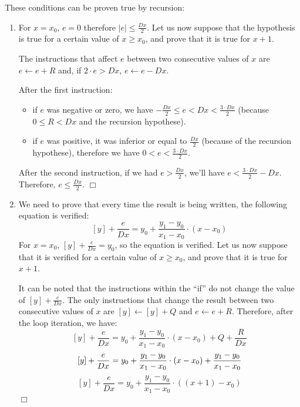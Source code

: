 \documentclass[a4paper,11pt]{kthesis}
\begin{document}
These conditions can be proven true by recursion:
\begin{enumerate}
\item For $x = x_{0}$, $e = 0$ therefore $|e| \leq \frac{Dx}{2}$. Let us now suppose that the hypothesis is true for a certain value of $x \geq x_{0}$, and prove that it is true for $x+1$.

The instructions that affect $e$ between two consecutive values of $x$ are $e \leftarrow e + R$ and, if $2\cdot e > Dx$, $e \leftarrow e - Dx$.

After the first instruction:
\begin{itemize}
\item if $e$ was negative or zero, we have $-\frac{Dx}{2} \leq e < Dx < \frac{3 \cdot Dx}{2} $ (because $0 \leq R < Dx$ and the recursion hypothese).
\item if $e$ was positive, it was inferior or equal to $\frac{Dx}{2}$ (because of the recursion hypothese), therefore we have $0 < e < \frac{3 \cdot Dx}{2} $.
\end{itemize}
After the second instruction, if we had $e > \frac{Dx}{2}$, we'll have $e < \frac{3 \cdot Dx}{2} - Dx$. Therefore, $e \leq \frac{Dx}{2}$. $\Box$

\item We need to prove that every time the result is being written, the following equation is verified:
\begin{equation}
\hspace{0cm} [y] + \frac{e}{Dx} = y_{0} + \frac{y_{1}-y_{0}}{x_{1}-x_{0}} \cdot (x - x_{0})
\end{equation}
For $x = x_{0}$, $[y] + \frac{e}{Dx} = y_{0}$, so the equation is verified. Let us now suppose that it is verified for a certain value of $x \geq x_{0}$, and prove that it is true for $x+1$.

It can be noted that the instructions within the ``if'' do not change the value of $[y] + \frac{e}{Dx}$. The only instructions that change the result between two consecutive values of $x$ are $[y] \leftarrow [y] + Q$ and $e \leftarrow e + R$. Therefore, after the loop iteration, we have:
\begin{equation}
\hspace{0cm} [y] + \frac{e}{Dx} = y_{0} + \frac{y_{1}-y_{0}}{x_{1}-x_{0}} \cdot (x - x_{0}) + Q + \frac{R}{Dx}
\end{equation}
\begin{equation}
\hspace{0cm} [y] + \frac{e}{Dx} = y_{0} + \frac{y_{1}-y_{0}}{x_{1}-x_{0}} \cdot (x - x_{0}) + \frac{y_{1}-y_{0}}{x_{1}-x_{0}} \\
\end{equation}
\begin{equation}
\hspace{0cm} [y] + \frac{e}{Dx} = y_{0} + \frac{y_{1}-y_{0}}{x_{1}-x_{0}} \cdot ((x + 1) - x_{0})
\end{equation}
$\Box$
\end{enumerate}
\end{document}
